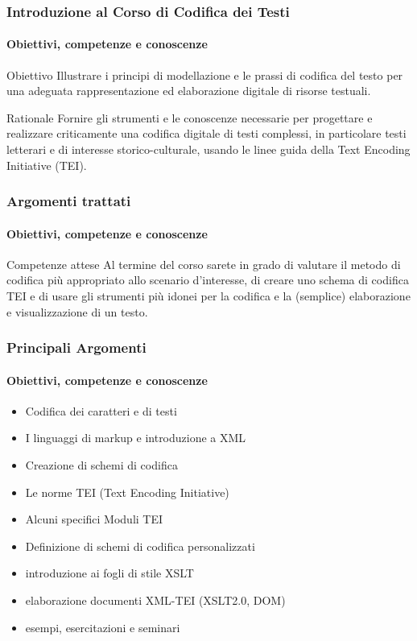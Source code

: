 \begin{frame}
    \frametitle{Introduzione al Corso di Codifica dei Testi}
    \framesubtitle{Obiettivi, competenze e conoscenze}
    \addtocounter{nframe}{1}
    
    \begin{block}{Obiettivo}
        Illustrare i principi di modellazione e le prassi di codifica del testo per una adeguata rappresentazione ed elaborazione digitale di risorse testuali.  
    \end{block}

    \begin{block}{Rationale}
       Fornire gli strumenti e le conoscenze necessarie per progettare e realizzare criticamente una codifica digitale di testi complessi, in particolare testi letterari e di interesse storico-culturale, usando le linee guida della Text Encoding Initiative (TEI).
    \end{block}

\end{frame}

\begin{frame}
    \frametitle{Argomenti trattati}
    \framesubtitle{Obiettivi, competenze e conoscenze}
    \addtocounter{nframe}{1}
    
    \begin{block}{Competenze attese}
        Al termine del corso sarete in grado di valutare il metodo di codifica più appropriato allo scenario d'interesse, di creare uno schema di codifica TEI e di usare gli strumenti più idonei per la codifica e la (semplice) elaborazione e visualizzazione di un testo.
    \end{block}

    

\end{frame}

\begin{frame}
    \frametitle{Principali Argomenti}
    \framesubtitle{Obiettivi, competenze e conoscenze}
    \addtocounter{nframe}{1}

    
        \begin{itemize}
            \item Codifica dei caratteri e di testi
            \item I linguaggi di markup e introduzione a XML
            \item Creazione di schemi di codifica
            \item Le norme TEI (Text Encoding Initiative)
            \item Alcuni specifici Moduli TEI
            \item Definizione di schemi di codifica personalizzati
            \item introduzione ai fogli di stile XSLT
            \item elaborazione documenti XML-TEI (XSLT2.0, DOM)
            \item esempi, esercitazioni e seminari 
        \end{itemize}
    

\end{frame}


